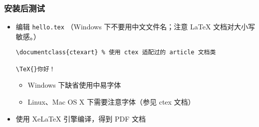 



\begin{frame}[fragile]
  \frametitle{安装后测试}

  \begin{itemize}
    \item 编辑 \texttt{hello.tex} （Windows 下不要用中文文件名；注意
      \LaTeX{} 文档对大小写敏感。）
      \lstset{language=[LaTeX]TeX}
      \begin{card} \begin{lstlisting}[basicstyle=\ttfamily]
\documentclass{ctexart} % 使用 ctex 适配过的 article 文档类

\TeX{}你好！

        \end{lstlisting}\end{card}
      \begin{itemize}
        \item Windows 下缺省使用中易字体
        \item Linux、Mac OS X 下需要注意字体（参见 ctex 文档）
      \end{itemize}
    \item 使用 XeLaTeX 引擎编译，得到 PDF 文档
      \begin{center}
      \end{center}
  \end{itemize}
\end{frame}

